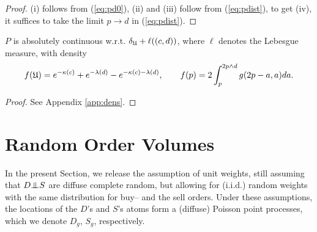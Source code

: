 \documentclass{aptpub}
\begin{document}
\begin{proof} (i) follows from (\ref{eq:pd0}), (ii) and (iii) follow from (\ref{eq:pdist}), to get (iv), it suffices to take the limit $p\rightarrow d$ in (\ref{eq:pdist}).
\end{proof}

\begin{corollary} \label{cor:dens}
 $P$ is absolutely continuous w.r.t. $\delta_{\mathfrak{U}}+\ell((c,d))$, where $\ell$ denotes the Lebesgue measure, with density 
\begin{equation}
f(\mathfrak{U})=e^{-\kappa(c)}+e^{-\lambda(d)}-e^{-\kappa(c)-\lambda(d)},\qquad 
f(p)=2 \int_p^{2 p \wedge d} g(2p-a,a) da.
\label{eq:pdens}
\end{equation}
\end{corollary}

\begin{proof} See Appendix \ref{app:dens}.
\end{proof}




 

\section{Random Order Volumes}
\label{sec:crr}

In the present Section, we release the assumption of unit weights, still assuming that $D\indep S$ are diffuse complete random, but allowing for (i.i.d.) random weights with the same distribution for buy-- and the sell orders. Under these assumptions, the locations of the $D$'s and $S$'s atoms form a (diffuse) Poisson point processes, which we denote $D_g$, $S_g$, respectively.

\def\cpo{\mathrm{CPo}}
\end{document}
